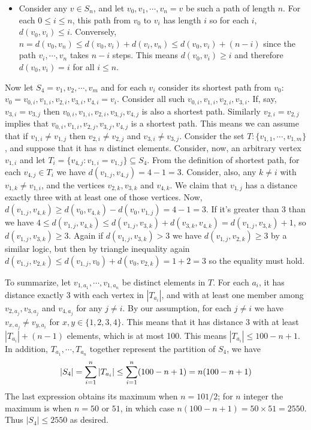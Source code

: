 \documentclass[11pt,a4paper]{article}
\begin{document}
\begin{enumerate}
\begin{itemize}
		\item Consider any $v\in S_n$, and let $v_0, v_1, \cdots , v_n=v$ be such a path of length $n$. For each $0\le i\le n$, this path from $v_0$ to $v_i$ has length $i$ so for each $i$, $d(v_0, v_i)\le i$. Conversely, $n=d(v_0, v_n)\le d(v_0, v_i)+d(v_i, v_n)\le d(v_0, v_i)+(n-i)$ since the path $v_i, \cdots , v_n$ takes $n-i$ steps. This means $d(v_0, v_i)\ge i$ and therefore $d(v_0, v_i)=i$ for all $i\le n$. 
	\end{itemize}
	Now let $S_4=v_1, v_2, \cdots , v_m$ and for each $v_i$ consider its shortest path from $v_0$: $v_0=v_{0, i}, v_{1, i}, v_{2, i}, v_{3, i}, v_{4, i}=v_i$. Consider all such $v_{0, i}, v_{1, i}, v_{2, i}, v_{3, i}$. If, say, $v_{3, i}=v_{3, j}$ then $v_{0, i}, v_{1, i}, v_{2, i}, v_{3, j}, v_{4, j}$ is also a shortest path. Similarly $v_{2, i}=v_{2, j}$ implies that $v_{0, i}, v_{1, i}, v_{2, j}, v_{3, j}, v_{4, j}$ is a shortest path. 
	This means we can assume that if $v_{1, i}\neq v_{1, j}$ then $v_{2, i}\neq v_{2, j}$ and $v_{3, i}\neq v_{3, j}$. 
	Consider the set $T: \{v_{1, 1}, \cdots , v_{1, m}\}$, and suppose that it has $n$ distinct elements. 
	Consider, now, an arbitrary vertex $v_{1, i}$ and let $T_i = \{v_{4, j}: v_{1, i}=v_{1, j}\}\subseteq S_4$. 
	From the definition of shortest path, for each $v_{4, j}\in T_i$ we have $d(v_{1, j}, v_{4, j})=4-1=3$. 
	Consider, also, any $k\neq i$ with $v_{1, k}\neq v_{1, i}$, and the vertices $v_{2, k}, v_{3, k}$ and $v_{4, k}$. We claim that $v_{1, j}$ has a distance exactly three with at least one of those vertices. 
	Now, $d(v_{1, j}, v_{4, k})\ge d(v_0, v_{4, k}) - d(v_0, v_{1, j})=4-1=3$. If it's greater than 3 than we have 
	$4\le d(v_{1, j}, v_{4, k})\le d(v_{1, j}, v_{3, k}) + d(v_{3, k}, v_{4, k}) = d(v_{1, j}, v_{3, k}) + 1$, so $d(v_{1, j}, v_{3, k})\ge 3$. Again if $d(v_{1, j}, v_{3, k}) > 3$ we have $d(v_{1, j}, v_{2, k})\ge 3$ by a similar logic, but then by triangle inequality again $d(v_{1, j}, v_{2, k})\le d(v_{1, j}, v_0)+d(v_0, v_{2, k})=1+2=3$ so the equality must hold. 
	
	To summarize, let $v_{1, a_1}, \cdots , v_{1, a_n}$ be distinct elements in $T$. For each $a_i$, it has distance exactly 3 with each vertex in $|T_{a_i}|$, and with at least one member among $v_{2, a_j}, v_{3, a_j}$ and $v_{4, a_j}$ for any $j\neq i$. By our assumption, for each $j\neq i$ we have $v_{x, a_j}\neq v_{y, a_i}$ for $x, y\in \{1, 2, 3, 4\}$. This means that it has distance 3 with at least $|T_{a_i}|+(n-1)$ elements, which is at most 100. This means $|T_{a_i}|\le 100-n+1$. In addition, $T_{a_1}, \cdots , T_{a_n}$ together represent the partition of $S_4$, we have 
	\[
	|S_4|=\displaystyle\sum_{i=1}^n |T_{a_i}|\le \displaystyle\sum_{i=1}^n (100-n+1) = n(100-n+1)
	\]
	The last expression obtains its maximum when $n=101/2$; for $n$ integer the maximum is when $n=50$ or $51$, in which case $n(100-n+1)=50\times 51 = 2550$. Thus $|S_4|\le 2550$ as desired. 
	

\end{enumerate}
\end{document}
